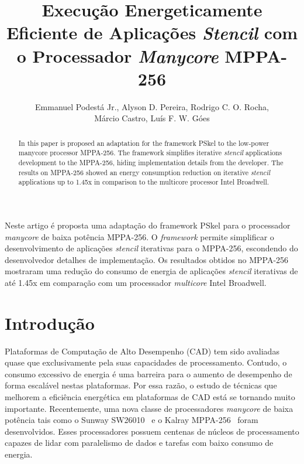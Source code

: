 \documentclass[12pt]{article}
\title{Execução Energeticamente Eficiente de Aplicações \textit{Stencil} com o Processador \textit{Manycore} MPPA-256}
\author{Emmanuel Podestá Jr.\inst{1}, Alyson D. Pereira\inst{1}, Rodrigo C. O. Rocha\inst{2},\\Márcio Castro\inst{1}, Luís F. W. Góes\inst{2}}
\newcommand{\fw}{\textit{framework}\xspace}
\newcommand{\mppa}{MPPA-256\xspace}
\newcommand{\stencil}{\textit{stencil}\xspace}
\begin{document}
\maketitle

\begin{abstract}
In this paper is proposed an adaptation for the framework PSkel to the low-power
manycore processor \mppa. The framework simplifies iterative \stencil
applications development to the \mppa, hiding implementation details from the
developer. The results on \mppa showed an energy consumption reduction on
iterative \stencil applications up to 1.45x in comparison to the multicore
processor Intel Broadwell.
\end{abstract}

\begin{resumo}
Neste artigo é proposta uma adaptação do framework PSkel para o processador
\textit{manycore} de baixa potência \mppa. O \fw permite simplificar o
desenvolvimento de aplicações \stencil iterativas para o \mppa, escondendo do
desenvolvedor detalhes de implementação. Os resultados obtidos no \mppa
mostraram uma redução do consumo de energia de aplicações \stencil iterativas de
até 1.45x em comparação com um processador \textit{multicore} Intel Broadwell.
\end{resumo}

\section{Introdução}

Plataformas de Computação de Alto Desempenho (CAD) tem sido avaliadas quase que
exclusivamente pela suas capacidades de processamento. Contudo, o consumo
excessivo de energia é uma barreira para o aumento de desempenho de forma
escalável nestas plataformas. Por essa razão, o estudo de técnicas que melhorem
a eficiência energética em plataformas de CAD está se tornando muito importante.
Recentemente, uma nova classe de processadores \textit{manycore} de baixa
potência tais como o Sunway SW26010~\cite{sunway:2016} e o Kalray
\mppa~\cite{Castro-IA3:2013} foram desenvolvidos. Esses processadores possuem
centenas de núcleos de processamento capazes de lidar com paralelismo de dados e
tarefas com baixo consumo de energia.
\end{document}
